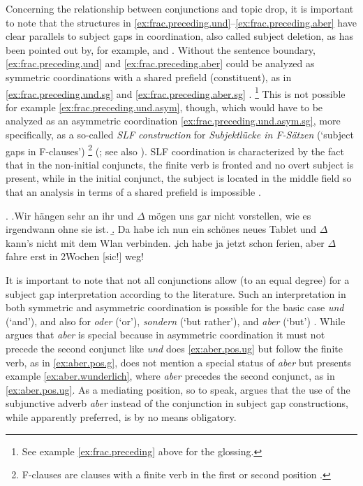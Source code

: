 Concerning the relationship between conjunctions  and topic drop, it is important to note that the structures in \ref{ex:frac.preceding.und}--\ref{ex:frac.preceding.aber} have clear parallels to subject gaps  in coordination, also called subject deletion, as has been pointed out by, for example, \citet{klein1993} and \citet{haegeman2007}.
Without the sentence boundary, \ref{ex:frac.preceding.und} and \ref{ex:frac.preceding.aber} could be analyzed as symmetric coordinations with a shared prefield (constituent), as in \ref{ex:frac.preceding.und.sg} and \ref{ex:frac.preceding.aber.sg} \citep[e.g.,][]{wilder1997}.%
\footnote{See example \ref{ex:frac.preceding} above for the glossing.}
%
This is not possible for example \ref{ex:frac.preceding.und.asym}, though, which would have to be analyzed as an asymmetric coordination \ref{ex:frac.preceding.und.asym.sg}, more specifically, as a so-called \textit{SLF construction} for \textit{Subjektlücke in F-Sätzen} (`subject gaps  in F-clauses')%
\footnote{F-clauses are clauses with a finite verb in the first or second position \citep[1]{hohle1983}.}
%
(\cite{hohle1983, hohle1990}; see also \cite{reich2007,reich2009,reich2009a,reich2013,bonitz2013,barnickel2017,oppermann2021}).
SLF coordination is characterized by the fact that in the non-initial conjuncts, the finite verb is fronted and no overt subject is present, while in the initial conjunct, the subject is located in the middle field  so that an analysis in terms of a shared prefield is impossible \citep{reich2008,reich2009a}.

\ex.
\a.\label{ex:frac.preceding.und.sg}Wir hängen sehr an ihr und $\Delta$ mögen uns gar nicht vorstellen, wie es irgendwann ohne sie ist.
\b.\label{ex:frac.preceding.und.asym.sg} Da habe ich nun ein schönes neues Tablet und $\Delta$ kann's nicht mit dem Wlan verbinden.
\c.\label{ex:frac.preceding.aber.sg}ich habe ja jetzt schon ferien, aber $\Delta$ fahre erst in 2Wochen [sic!] weg!

It is important to note that not all conjunctions  allow (to an equal degree) for a subject gap  interpretation according to the literature.
Such an interpretation in both symmetric and asymmetric coordination is possible for the basic case \textit{und} (`and'), and also for \textit{oder} (`or'), \textit{sondern} (`but rather'), and \textit{aber} (`but') \citep{hohle1983, wunderlich1988}.
While \citet{hohle1983} argues that \textit{aber} is special because in asymmetric coordination it must not precede the second conjunct like \textit{und} does \ref{ex:aber.pos.ug} but follow the finite verb, as in \ref{ex:aber.pos.g}, \citet{wunderlich1988} does not mention a special status of \textit{aber} but presents example \ref{ex:aber.wunderlich}, where \textit{aber} precedes the second conjunct, as in \ref{ex:aber.pos.ug}.
As a mediating position, so to speak, \citet[504]{vandevelde1986} argues that the use of the subjunctive adverb \textit{aber} instead of the conjunction  in subject gap  constructions, while apparently preferred, is by no means obligatory.

